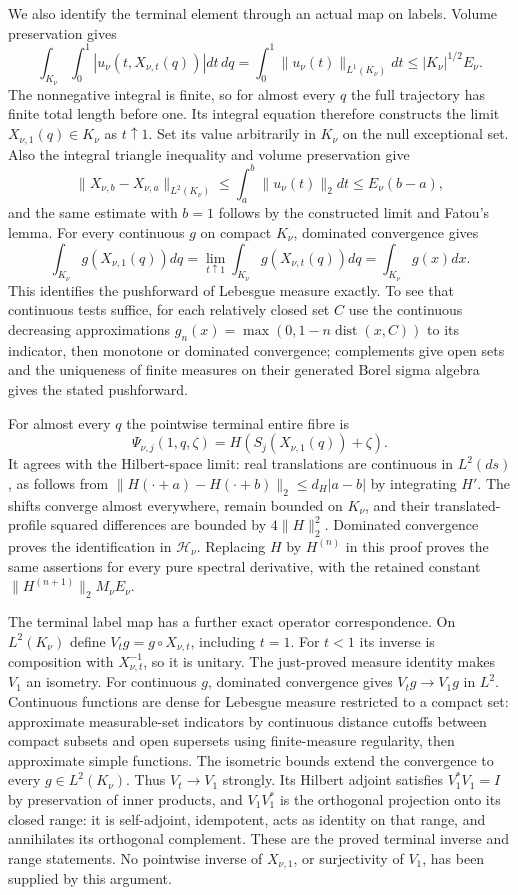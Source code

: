 We also identify the terminal element through an actual map on labels.
Volume preservation gives
\[
 \int_{K_\nu}\int_0^1|u_\nu(t,X_{\nu,t}(q))|dt\,dq
 =\int_0^1\|u_\nu(t)\|_{L^1(K_\nu)}dt
 \leq |K_\nu|^{1/2}E_\nu.
\]
The nonnegative integral is finite, so for almost every $q$ the full
trajectory has finite total length before one. Its integral equation
therefore constructs the limit $X_{\nu,1}(q)\in K_\nu$ as $t\uparrow1$.
Set its value arbitrarily in $K_\nu$ on the null exceptional set.
Also the integral triangle inequality and volume preservation give
\[
 \|X_{\nu,b}-X_{\nu,a}\|_{L^2(K_\nu)}
       \leq\int_a^b\|u_\nu(t)\|_2dt
       \leq E_\nu(b-a),
\]
and the same estimate with $b=1$ follows by the constructed limit and
Fatou's lemma. For every continuous $g$ on compact $K_\nu$, dominated
convergence gives
\[
 \int_{K_\nu}g(X_{\nu,1}(q))dq
   =\lim_{t\uparrow1}\int_{K_\nu}g(X_{\nu,t}(q))dq
   =\int_{K_\nu}g(x)dx.
\]
This identifies the pushforward of Lebesgue measure exactly. To see
that continuous tests suffice, for each relatively closed set $C$ use
the continuous decreasing approximations
$g_n(x)=\max(0,1-n\operatorname{dist}(x,C))$ to its indicator, then
monotone or dominated convergence; complements give open sets and
the uniqueness of finite measures on their generated Borel sigma
algebra gives the stated pushforward.

For almost every $q$ the pointwise terminal entire fibre is
\[
 \Psi_{\nu,j}(1,q,\zeta)
      =H(S_j(X_{\nu,1}(q))+\zeta).
\]
It agrees with the Hilbert-space limit: real translations are continuous
in $L^2(ds)$, as follows from
$\|H(\cdot+a)-H(\cdot+b)\|_2\leq d_H|a-b|$ by integrating $H'$.
The shifts converge almost everywhere, remain bounded on $K_\nu$,
and their translated-profile squared differences are bounded by
$4\|H\|_2^2$. Dominated convergence proves the identification in
$\mathcal H_\nu$. Replacing $H$ by $H^{(n)}$ in this proof proves the
same assertions for every pure spectral derivative, with the retained
constant $\|H^{(n+1)}\|_2M_\nu E_\nu$.

The terminal label map has a further exact operator correspondence.
On $L^2(K_\nu)$ define $V_tg=g\circ X_{\nu,t}$, including $t=1$.
For $t<1$ its inverse is composition with $X_{\nu,t}^{-1}$, so it is
unitary. The just-proved measure identity makes $V_1$ an isometry.
For continuous $g$, dominated convergence gives $V_tg\to V_1g$ in
$L^2$. Continuous functions are dense for Lebesgue measure restricted
to a compact set: approximate measurable-set indicators by continuous
distance cutoffs between compact subsets and open supersets using
finite-measure regularity, then approximate simple functions. The
isometric bounds extend the convergence to every $g\in L^2(K_\nu)$.
Thus $V_t\to V_1$ strongly. Its Hilbert adjoint satisfies
$V_1^*V_1=I$ by preservation of inner products, and $V_1V_1^*$ is the
orthogonal projection onto its closed range: it is self-adjoint,
idempotent, acts as identity on that range, and annihilates its
orthogonal complement. These are the proved terminal inverse and
range statements. No pointwise inverse of $X_{\nu,1}$, or surjectivity
of $V_1$, has been supplied by this argument.

